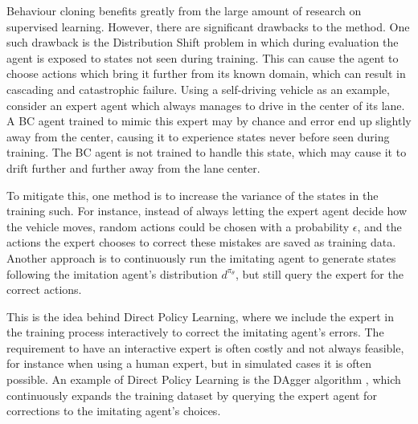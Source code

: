 Behaviour cloning benefits greatly from the large amount of research on supervised learning. 
However, there are significant drawbacks to the method.
One such drawback is the 
Distribution Shift problem 
in which during evaluation the agent is exposed to states
not seen during training.
This can cause the agent to choose actions which bring it further from its known domain,
which can result in cascading and catastrophic failure.
Using a self-driving vehicle as an example,
consider an expert agent which always manages to drive in the center of its lane.
A BC agent trained to mimic this expert may by chance and error end up slightly away from the center,
causing it to experience states never before seen during training.
The BC agent is not trained to handle this state,
which may cause it to drift further and further away from the lane center.

To mitigate this,
one method is to increase the variance of the states in the training such.
For instance,
instead of always letting the expert agent decide how the vehicle moves,
random actions could be chosen with a probability $\epsilon$,
and the actions the expert chooses to correct these mistakes are saved as training data.
Another approach is to continuously run the imitating agent to generate states
following the imitation agent's distribution $d^{\pi_{\theta}}$,
but still query the expert for the correct actions.

This is the idea behind Direct Policy Learning,
where we include the expert in the training process interactively
to correct the imitating agent's errors.
The requirement to have an interactive expert is often costly and not always feasible,
for instance when using a human expert,
but in simulated cases it is often possible.
An example of Direct Policy Learning
is the DAgger algorithm \cite{dagger},
which continuously expands the training dataset
by querying the expert agent for corrections to the imitating agent's choices.

